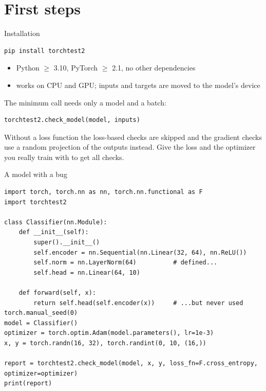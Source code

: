 \documentclass[aspectratio=169,11pt]{beamer}
\begin{document}
\section{First steps}

\begin{frame}[fragile]{Installation}
  \begin{lstlisting}[style=shell]
pip install torchtest2
  \end{lstlisting}
  \begin{itemize}
    \item Python $\geq$ 3.10, PyTorch $\geq$ 2.1, \alert{no other dependencies}
    \item works on CPU and GPU; inputs and targets are moved to the model's device
  \end{itemize}
  \medskip
  The minimum call needs only a model and a batch:
  \begin{lstlisting}
torchtest2.check_model(model, inputs)
  \end{lstlisting}
  Without a loss function the loss-based checks are skipped and the gradient checks use a random
  projection of the outputs instead. Give the loss and the optimizer you really train with to get
  all checks.
\end{frame}

\begin{frame}[fragile]{A model with a bug}
  \begin{lstlisting}
import torch, torch.nn as nn, torch.nn.functional as F
import torchtest2

class Classifier(nn.Module):
    def __init__(self):
        super().__init__()
        self.encoder = nn.Sequential(nn.Linear(32, 64), nn.ReLU())
        self.norm = nn.LayerNorm(64)          # defined...
        self.head = nn.Linear(64, 10)

    def forward(self, x):
        return self.head(self.encoder(x))     # ...but never used
torch.manual_seed(0)
model = Classifier()
optimizer = torch.optim.Adam(model.parameters(), lr=1e-3)
x, y = torch.randn(16, 32), torch.randint(0, 10, (16,))

report = torchtest2.check_model(model, x, y, loss_fn=F.cross_entropy, optimizer=optimizer)
print(report)
  \end{lstlisting}
\end{frame}
\end{document}
